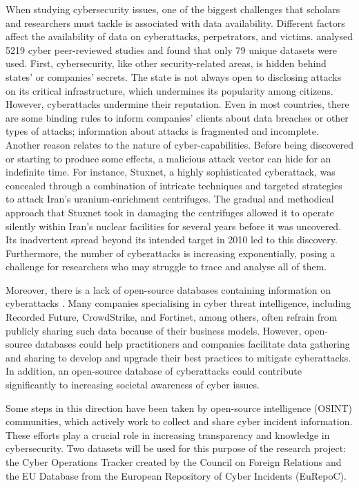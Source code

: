 When studying cybersecurity issues, one of the biggest challenges that scholars and researchers must tackle is associated with data availability. Different factors affect the availability of data on cyberattacks, perpetrators, and victims. \textcite{cremer_2022_cyber} analysed 5219 cyber peer-reviewed studies and found that only 79 unique datasets were used. First, cybersecurity, like other security-related areas, is hidden behind states' or companies’ secrets. The state is not always open to disclosing attacks on its critical infrastructure, which undermines its popularity among citizens. However, cyberattacks undermine their reputation. Even in most countries, there are some binding rules to inform companies’ clients about data breaches or other types of attacks; information about attacks is fragmented and incomplete. Another reason relates to the nature of cyber-capabilities. Before being discovered or starting to produce some effects, a malicious attack vector can hide for an indefinite time. For instance, Stuxnet, a highly sophisticated cyberattack, was concealed through a combination of intricate techniques and targeted strategies to attack Iran's uranium-enrichment centrifuges. The gradual and methodical approach that Stuxnet took in damaging the centrifuges allowed it to operate silently within Iran's nuclear facilities for several years before it was uncovered. Its inadvertent spread beyond its intended target in 2010 led to this discovery. 
Furthermore, the number of cyberattacks is increasing exponentially, posing a challenge for researchers who may struggle to trace and analyse all of them. 

Moreover, there is a lack of open-source databases containing information on cyberattacks \autocite{cremer_2022_cyber}. Many companies specialising in cyber threat intelligence, including Recorded Future, CrowdStrike, and Fortinet, among others, often refrain from publicly sharing such data because of their business models. However, open-source databases could help practitioners and companies facilitate data gathering and sharing to develop and upgrade their best practices to mitigate cyberattacks. In addition, an open-source database of cyberattacks could contribute significantly to increasing societal awareness of cyber issues. 

Some steps in this direction have been taken by open-source intelligence (OSINT) communities, which actively work to collect and share cyber incident information. These efforts play a crucial role in increasing transparency and knowledge in cybersecurity. 
Two datasets will be used for this purpose of the research project: the Cyber Operations Tracker created by the Council on Foreign Relations and the EU Database from the European Repository of Cyber Incidents (EuRepoC). 

